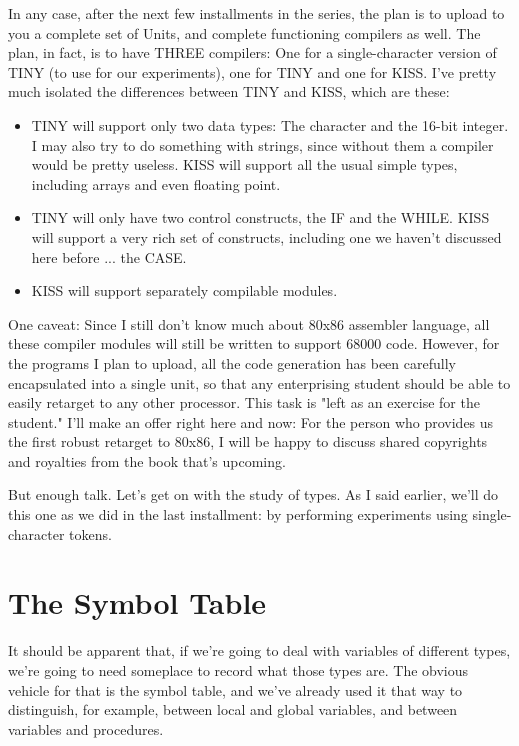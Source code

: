 In any case, after  the  next few installments in the series, the plan  is  to  upload to you a complete set of Units, and complete functioning compilers as  well. The  plan, in fact, is to have THREE compilers:  One for  a single-character version of TINY (to use  for  our  experiments), one for TINY and one for KISS. I've pretty much isolated the differences between TINY and KISS, which are these:

\begin{itemize}
\item	TINY will support only two data types: The character and the 16-bit  integer. I may also  try  to  do  something  with strings, since  without  them  a  compiler  would  be pretty useless. KISS will support all  the  usual  simple  types, including arrays and even floating point.
\item	TINY will only have two control constructs, the  IF  and the WHILE. KISS will  support  a  very  rich set of constructs, including one we haven't discussed here before ... the CASE.
\item	KISS will support separately compilable modules.
\end{itemize}

One caveat: Since I still don't know much  about  80x86 assembler language, all these compiler modules  will  still  be  written to support 68000 code. However, for the programs I plan  to upload, all the code generation  has  been  carefully encapsulated into a single unit, so that any enterprising student should  be  able to easily retarget to any other processor. This task is "left as an exercise for the  student."    I'll  make an offer right here and now:  For the person who provides us the first robust retarget to 80x86, I will be happy to discuss shared copyrights and royalties from the book that's upcoming.

But enough talk. Let's get on with  the  study  of  types. As I said  earlier, we'll  do  this  one  as  we  did  in   the  last installment:  by  performing experiments  using  single-character tokens.

\section{The Symbol Table}

It should be apparent that, if we're going to deal with variables of different types, we're going  to need someplace to record what those  types are. The obvious vehicle for  that  is  the  symbol table, and we've already  used  it  that  way to distinguish, for example, between  local  and  global  variables, and   between variables and procedures.

